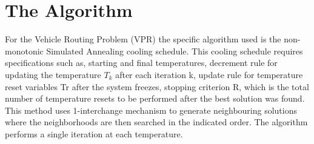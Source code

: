\documentclass[11pt]{article}
\newcommand{\<}{\langle}
\renewcommand{\>}{\rangle}
\theoremstyle{definition}
\begin{document}
\section{The Algorithm}
For the Vehicle Routing Problem (VPR) the specific algorithm used is the non-monotonic Simulated Annealing cooling schedule. This cooling schedule requires specifications such as, starting and final temperatures, decrement rule for updating the temperature $T_k$ after each iteration k, update rule for temperature reset variables Tr after the system freezes, stopping criterion R, which is the total number of temperature resets to be performed after the best solution was found. This method uses 1-interchange mechanism to generate neighbouring solutions where the neighborhoods are then searched in the indicated order. The algorithm performs a single iteration at each temperature.  
\end{document}
